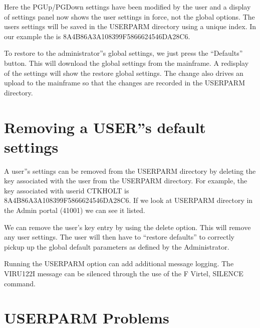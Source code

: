 \documentclass[letterpaper,10pt,english]{sphinxmanual}
\begin{document}
Here the PGUp/PGDown settings have been modified by the user and a display of settings panel now shows the user settings in force, not the global options. The users settings will be saved in the USERPARM directory using a unique index. In our example the is 8A4B86A3A108399F5866624546DA28C6.



To restore to the administrator”s global settings, we just press the “Defaults” button. This will download the global settings from the mainframe. A redisplay of the settings will show the restore global settings. The change also drives an upload to the mainframe so that the changes are recorded in the USERPARM directory.




\section{Removing a USER”s default settings}
\label{\detokenize{TN202002:removing-a-user-s-default-settings}}
A user”s settings can be removed from the USERPARM directory by deleting the key associated with the user from the USERPARM directory. For example, the key associated with userid CTKHOLT is 8A4B86A3A108399F5866624546DA28C6. If we look at USERPARM directory in the Admin portal (41001) we can see it listed.


We can remove the user’s key entry by using the delete option. This will remove any user settings. The user will then have to “restore defaults” to correctly pickup up the global default parameters as defined by the Administrator.


Running the USERPARM option can add additional message logging. The VIRU122I message can be silenced through the use of the F Virtel, SILENCE command.


\section{USERPARM Problems}
\label{\detokenize{TN202002:userparm-problems}}
\end{document}
